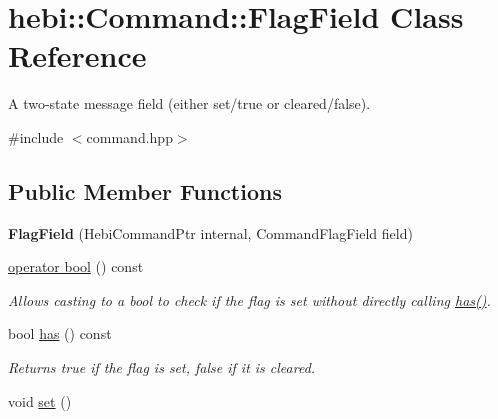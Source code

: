 \hypertarget{classhebi_1_1Command_1_1FlagField}{}\section{hebi\+:\+:Command\+:\+:Flag\+Field Class Reference}
\label{classhebi_1_1Command_1_1FlagField}


A two-\/state message field (either set/true or cleared/false).  




{\ttfamily \#include $<$command.\+hpp$>$}

\subsection*{Public Member Functions}
\begin{DoxyCompactItemize}
\item 
{\bfseries Flag\+Field} (Hebi\+Command\+Ptr internal, Command\+Flag\+Field field)\hypertarget{classhebi_1_1Command_1_1FlagField_a4252702a9af7fe9b656d360d8ff7f14e}{}\label{classhebi_1_1Command_1_1FlagField_a4252702a9af7fe9b656d360d8ff7f14e}

\item 
\hyperlink{classhebi_1_1Command_1_1FlagField_ae3cc1d47cae8b937512fe2ef62af39c0}{operator bool} () const 
\begin{DoxyCompactList}\small\item\em Allows casting to a bool to check if the flag is set without directly calling {\ttfamily \hyperlink{classhebi_1_1Command_1_1FlagField_ae39a1f2ae889115442193dd0c04dcc29}{has()}}. \end{DoxyCompactList}\item 
bool \hyperlink{classhebi_1_1Command_1_1FlagField_ae39a1f2ae889115442193dd0c04dcc29}{has} () const \hypertarget{classhebi_1_1Command_1_1FlagField_ae39a1f2ae889115442193dd0c04dcc29}{}\label{classhebi_1_1Command_1_1FlagField_ae39a1f2ae889115442193dd0c04dcc29}

\begin{DoxyCompactList}\small\item\em Returns {\ttfamily true} if the flag is set, false if it is cleared. \end{DoxyCompactList}\item 
void \hyperlink{classhebi_1_1Command_1_1FlagField_a51fa751950973f51359f628b2714b683}{set} ()\hypertarget{classhebi_1_1Command_1_1FlagField_a51fa751950973f51359f628b2714b683}{}\label{classhebi_1_1Command_1_1FlagField_a51fa751950973f51359f628b2714b683}


\end{DoxyCompactItemize}
